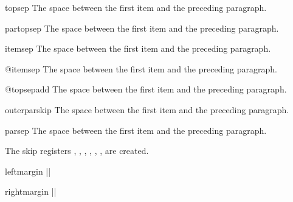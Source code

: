  

\begin{docCommand}{topsep} {}
The space between the first item and the preceding paragraph.
\end{docCommand}

\begin{docCommand}{partopsep} {}
The space between the first item and the preceding paragraph.
\end{docCommand}

\begin{docCommand}{itemsep} {}
The space between the first item and the preceding paragraph.
\end{docCommand}

\begin{docCommand}{@itemsep} {}
The space between the first item and the preceding paragraph.
\end{docCommand}

\begin{docCommand}{@topsepadd} {}
The space between the first item and the preceding paragraph.
\end{docCommand}

\begin{docCommand}{outerparskip} {}
The space between the first item and the preceding paragraph.
\end{docCommand}

\begin{docCommand}{parsep} {}
The space between the first item and the preceding paragraph.
\end{docCommand}

The skip registers , , 
, , ,
,  are created.

    \begin{teX}
\newskip\partopsep
\newskip\itemsep
\newskip\parsep
\newskip\@topsep
\newskip\@topsepadd
\newskip\@outerparskip
    \end{teX}
 
 
\begin{docCommand}{leftmargin} {}
|\newdimen\leftmargin|
\end{docCommand}

\begin{docCommand}{rightmargin} {}
|\newdimen\rightmargin|

\end{docCommand}

